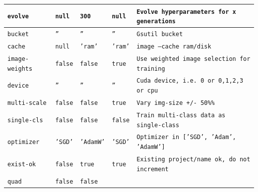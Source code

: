 \begin{table}
\begin{center}
\begin{tabular}{ | m{8em} | m{5em} | m{5em} | 
 m{5em}| m{15em} | }
            \hline
                \texttt{evolve} &
                \centering\texttt{null} & 
                \centering\texttt{300} & 
                \centering\texttt{null} & 
                \texttt{Evolve hyperparameters for x generations}
                \tabularnewline
            \hline
                \texttt{bucket} &
                \centering\texttt{''} & 
                \centering\texttt{''} & 
                \centering\texttt{''} & 
                \texttt{Gsutil bucket}
                \tabularnewline
            \hline
                \texttt{cache} &
                \centering\texttt{null} & 
                \centering\texttt{'ram'} & 
                \centering\texttt{'ram'} & 
                \texttt{image --cache ram/disk}
                \tabularnewline
            \hline
                \texttt{image-weights} &
                \centering\texttt{false} & 
                \centering\texttt{false} & 
                \centering\texttt{true} & 
                \texttt{Use weighted image selection for training}
                \tabularnewline
            \hline
                \texttt{device} &
                \centering\texttt{''} & 
                \centering\texttt{''} & 
                \centering\texttt{''} & 
                \texttt{Cuda device, i.e. 0 or 0,1,2,3 or cpu}
                \tabularnewline
            \hline
                \texttt{multi-scale} &
                \centering\texttt{false} & 
                \centering\texttt{false} & 
                \centering\texttt{true} & 
                \texttt{Vary img-size +/- 50\%\%}
                \tabularnewline
            \hline
                \texttt{single-cls} &
                \centering\texttt{false} & 
                \centering\texttt{false} & 
                \centering\texttt{false} & 
                \texttt{Train multi-class data as single-class}
                \tabularnewline
            \hline
                \texttt{optimizer} &
                \centering\texttt{'SGD'} & 
                \centering\texttt{'AdamW'} & 
                \centering\texttt{'SGD'} & 
                \texttt{Optimizer in ['SGD', 'Adam', 'AdamW']}
                \tabularnewline
            \hline
                \texttt{exist-ok} &
                \centering\texttt{false} & 
                \centering\texttt{true} & 
                \centering\texttt{true} & 
                \texttt{Existing project/name ok, do not increment}
                \tabularnewline
            \hline
                \texttt{quad} &
                \centering\texttt{false} & 
                \centering\texttt{false} & 

\end{tabular}
\end{center}
\end{table}
